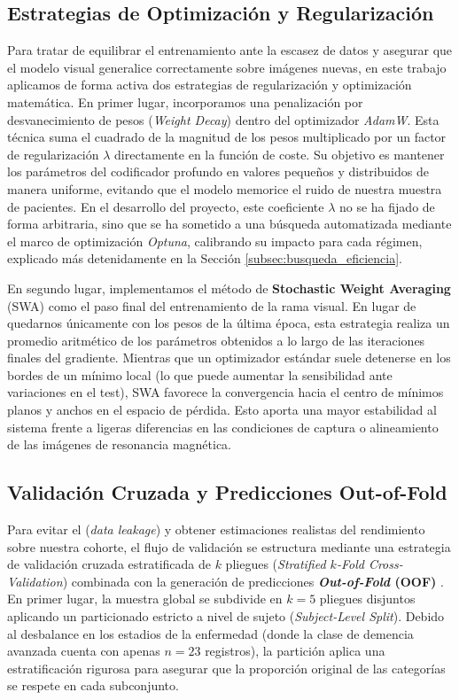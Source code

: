 \documentclass[12pt, oneside, english, spanish]{book}
\begin{document}
\subsection{Estrategias de Optimización y Regularización} \label{subsec:optimizacion_regularizacion_teoria}

Para tratar de equilibrar el entrenamiento ante la escasez de datos y asegurar que el modelo visual generalice correctamente sobre imágenes nuevas, en este trabajo aplicamos de forma activa dos estrategias de regularización y optimización matemática. En primer lugar, incorporamos una penalización por desvanecimiento de pesos (\textit{Weight Decay}) dentro del optimizador \textit{AdamW}. Esta técnica suma el cuadrado de la magnitud de los pesos multiplicado por un factor de regularización $\lambda$ directamente en la función de coste. Su objetivo es mantener los parámetros del codificador profundo en valores pequeños y distribuidos de manera uniforme, evitando que el modelo memorice el ruido de nuestra muestra de pacientes. En el desarrollo del proyecto, este coeficiente $\lambda$ no se ha fijado de forma arbitraria, sino que se ha sometido a una búsqueda automatizada mediante el marco de optimización \textit{Optuna}, calibrando su impacto para cada régimen, explicado más detenidamente en la Sección \ref{subsec:busqueda_eficiencia}.

En segundo lugar, implementamos el método de \textbf{Stochastic Weight Averaging} (SWA) \cite{izmailov2018averaging} como el paso final del entrenamiento de la rama visual. En lugar de quedarnos únicamente con los pesos de la última época, esta estrategia realiza un promedio aritmético de los parámetros obtenidos a lo largo de las iteraciones finales del gradiente. Mientras que un optimizador estándar suele detenerse en los bordes de un mínimo local (lo que puede aumentar la sensibilidad ante variaciones en el test), SWA favorece la convergencia hacia el centro de mínimos planos y anchos en el espacio de pérdida. Esto aporta una mayor estabilidad al sistema frente a ligeras diferencias en las condiciones de captura o alineamiento de las imágenes de resonancia magnética.  

\subsection{Validación Cruzada y Predicciones Out-of-Fold} \label{subsec:teoria_oof}

Para evitar el (\textit{data leakage}) y obtener estimaciones realistas del rendimiento sobre nuestra cohorte, el flujo de validación se estructura mediante una estrategia de validación cruzada estratificada de $k$ pliegues (\textit{Stratified $k$-Fold Cross-Validation}) combinada con la generación de predicciones \textbf{\textit{Out-of-Fold} (OOF)} \cite{wen2020convolutional}. En primer lugar, la muestra global se subdivide en $k = 5$ pliegues disjuntos aplicando un particionado estricto a nivel de sujeto (\textit{Subject-Level Split}). Debido al desbalance en los estadios de la enfermedad (donde la clase de demencia avanzada cuenta con apenas $n = 23$ registros), la partición aplica una estratificación rigurosa para asegurar que la proporción original de las categorías se respete en cada subconjunto.
\end{document}
